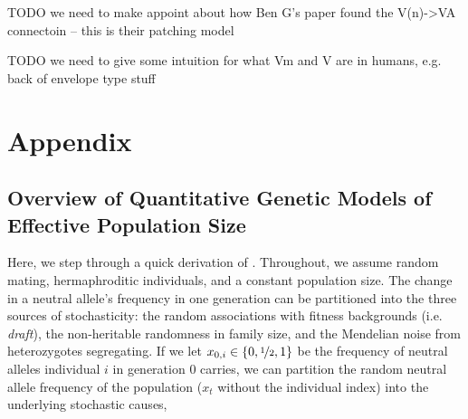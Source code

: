 \documentclass[11pt]{article}
\begin{document}











TODO we need to make appoint about how Ben G's paper found the V(n)->VA connectoin -- this is their patching model

TODO we need to give some intuition for what Vm and V are in humans, e.g. back of envelope type stuff

\section*{Appendix}

\subsection*{Overview of Quantitative Genetic Models of Effective Population Size}

Here, we step through a quick derivation of \textcite{Santiago1995-hx}.
Throughout, we assume random mating, hermaphroditic individuals, and a constant
population size. The change in a neutral allele's frequency in one generation
can be partitioned into the three sources of stochasticity: the random
associations with fitness backgrounds (i.e. \emph{draft}), the non-heritable
randomness in family size, and the Mendelian noise from heterozygotes
segregating. If we let $x_{0,i} \in \{0, \nicefrac{1}{2}, 1\}$ be the frequency
of neutral alleles individual $i$ in generation 0 carries, we can partition the
random neutral allele frequency of the population ($x_t$ without the individual
index) into the underlying stochastic causes,
\end{document}
